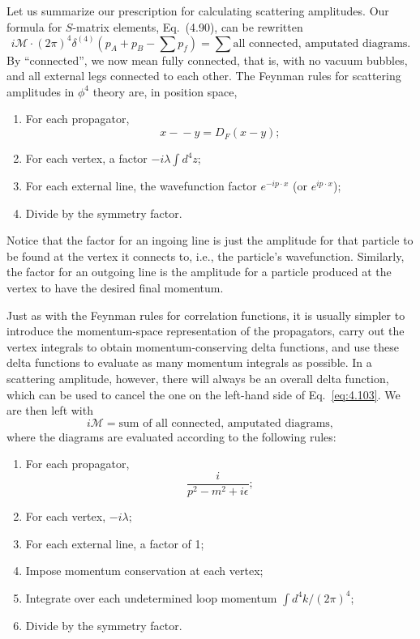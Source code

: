 Let us summarize our prescription for calculating scattering amplitudes.
Our formula for $S$-matrix elements, Eq.~(4.90), can be rewritten
\begin{equation}
  i\mathcal{M}\cdot(2\pi)^4\delta^{(4)}(p_A+p_B-\textstyle\sum p_f)
    = \sum \text{all connected, amputated diagrams} .
  \label{eq:4.103}
\end{equation}
By ``connected'', we now mean fully connected, that is, with no vacuum
bubbles, and all external legs connected to each other.  The Feynman rules
for scattering amplitudes in $\phi^4$ theory are, in position space,
\begin{enumerate}
  \item For each propagator,
    \begin{equation}
      x\!-\!-\!y = D_F(x-y);
    \end{equation}
  \item For each vertex, a factor $-i\lambda\int d^4z$;
  \item For each external line, the wavefunction factor $e^{-ip\cdot x}$ (or
    $e^{ip\cdot x}$);
  \item Divide by the symmetry factor.
\end{enumerate}
Notice that the factor for an ingoing line is just the amplitude for that
particle to be found at the vertex it connects to, i.e., the particle's
wavefunction.  Similarly, the factor for an outgoing line is the amplitude
for a particle produced at the vertex to have the desired final momentum.

Just as with the Feynman rules for correlation functions, it is usually
simpler to introduce the momentum-space representation of the propagators,
carry out the vertex integrals to obtain momentum-conserving delta functions,
and use these delta functions to evaluate as many momentum integrals as
possible.  In a scattering amplitude, however, there will always be an
overall delta function, which can be used to cancel the one on the left-hand
side of Eq.~\eqref{eq:4.103}.  We are then left with
\begin{equation}
  i\mathcal{M} = \text{sum of all connected, amputated diagrams},
  \label{eq:4.104}
\end{equation}
where the diagrams are evaluated according to the following rules:
\begin{enumerate}
  \item For each propagator,
    \begin{equation}
      \frac{i}{p^2-m^2+i\epsilon} ;
    \end{equation}
  \item For each vertex, $-i\lambda$;
  \item For each external line, a factor of 1;
  \item Impose momentum conservation at each vertex;
  \item Integrate over each undetermined loop momentum $\int d^4k/(2\pi)^4$;
  \item Divide by the symmetry factor.
\end{enumerate}

